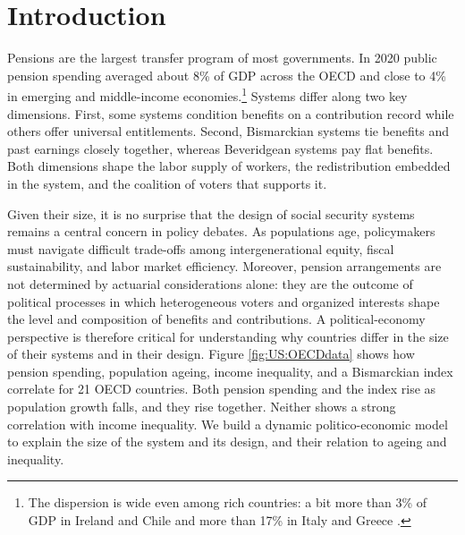 \section{Introduction}\label{sec:introduction}

Pensions are the largest transfer program of most governments. In 2020 public pension spending averaged about 8\% of GDP across the OECD and close to 4\% in emerging and middle-income economies.\footnote{The dispersion is wide even among rich countries: a bit more than 3\% of GDP in Ireland and Chile and more than 17\% in Italy and Greece \parencite{OECDpen}.} Systems differ along two key dimensions. First, some systems condition benefits on a contribution record while others offer universal entitlements. Second, Bismarckian systems tie benefits and past earnings closely together, whereas Beveridgean systems pay flat benefits. Both dimensions shape the labor supply of workers, the redistribution embedded in the system, and the coalition of voters that supports it.

Given their size, it is no surprise that the design of social security systems remains a central concern in policy debates. As populations age, policymakers must navigate difficult trade-offs among intergenerational equity, fiscal sustainability, and labor market efficiency. Moreover, pension arrangements are not determined by actuarial considerations alone: they are the outcome of political processes in which heterogeneous voters and organized interests shape the level and composition of benefits and contributions. A political-economy perspective is therefore critical for understanding why countries differ in the size of their systems and in their design. Figure \ref{fig:US:OECDdata} shows how pension spending, population ageing, income inequality, and a Bismarckian index correlate for 21 OECD countries. Both pension spending and the index rise as population growth falls, and they rise together. Neither shows a strong correlation with income inequality. We build a dynamic politico-economic model to explain the size of the system and its design, and their relation to ageing and inequality.


